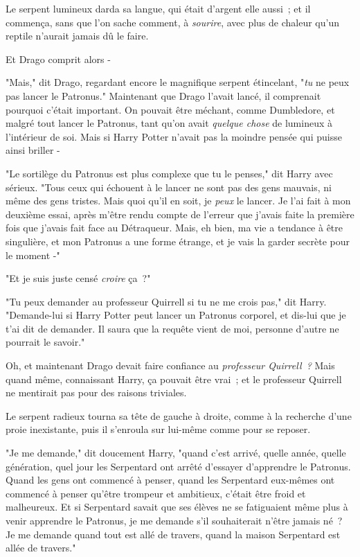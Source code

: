 Le serpent lumineux darda sa langue, qui était d'argent elle aussi~; et il commença, sans que l'on sache comment, à \emph{sourire}, avec plus de chaleur qu'un reptile n'aurait jamais dû le faire.

Et Drago comprit alors -

"Mais," dit Drago, regardant encore le magnifique serpent étincelant, "\emph{tu} ne peux pas lancer le Patronus." Maintenant que Drago l'avait lancé, il comprenait pourquoi c'était important. On pouvait être méchant, comme Dumbledore, et malgré tout lancer le Patronus, tant qu'on avait \emph{quelque chose} de lumineux à l'intérieur de soi. Mais si Harry Potter n'avait pas la moindre pensée qui puisse ainsi briller -

"Le sortilège du Patronus est plus complexe que tu le penses," dit Harry avec sérieux. "Tous ceux qui échouent à le lancer ne sont pas des gens mauvais, ni même des gens tristes. Mais quoi qu'il en soit, je \emph{peux} le lancer. Je l'ai fait à mon deuxième essai, après m'être rendu compte de l'erreur que j'avais faite la première fois que j'avais fait face au Détraqueur. Mais, eh bien, ma vie a tendance à être singulière, et mon Patronus a une forme étrange, et je vais la garder secrète pour le moment -"

"Et je suis juste censé \emph{croire} ça~?"

"Tu peux demander au professeur Quirrell si tu ne me crois pas," dit Harry. "Demande-lui si Harry Potter peut lancer un Patronus corporel, et dis-lui que je t'ai dit de demander. Il saura que la requête vient de moi, personne d'autre ne pourrait le savoir."

Oh, et maintenant Drago devait faire confiance au \emph{professeur Quirrell~?} Mais quand même, connaissant Harry, ça pouvait être vrai~; et le professeur Quirrell ne mentirait pas pour des raisons triviales.

Le serpent radieux tourna sa tête de gauche à droite, comme à la recherche d'une proie inexistante, puis il s'enroula sur lui-même comme pour se reposer.

"Je me demande," dit doucement Harry, "quand c'est arrivé, quelle année, quelle génération, quel jour les Serpentard ont arrêté d'essayer d'apprendre le Patronus. Quand les gens ont commencé à penser, quand les Serpentard eux-mêmes ont commencé à penser qu'être trompeur et ambitieux, c'était être froid et malheureux. Et si Serpentard savait que ses élèves ne se fatiguaient même plus à venir apprendre le Patronus, je me demande s'il souhaiterait n'être jamais né~? Je me demande quand tout est allé de travers, quand la maison Serpentard est allée de travers."

